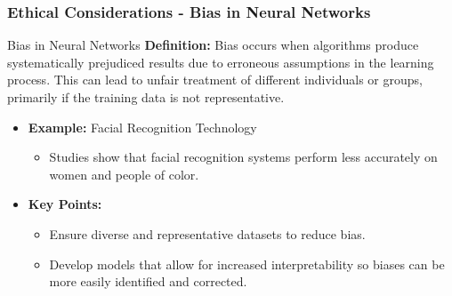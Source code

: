 \documentclass{beamer}
\begin{document}
\begin{frame}[fragile]
    \frametitle{Ethical Considerations - Bias in Neural Networks}
    \begin{block}{Bias in Neural Networks}
        \textbf{Definition:} Bias occurs when algorithms produce systematically prejudiced results due to erroneous assumptions in the learning process.
        This can lead to unfair treatment of different individuals or groups, primarily if the training data is not representative.
    \end{block}

    \begin{itemize}
        \item \textbf{Example:} Facial Recognition Technology
              \begin{itemize}
                  \item Studies show that facial recognition systems perform less accurately on women and people of color.
              \end{itemize}
        
        \item \textbf{Key Points:}
              \begin{itemize}
                  \item Ensure diverse and representative datasets to reduce bias.
                  \item Develop models that allow for increased interpretability so biases can be more easily identified and corrected.
              \end{itemize}
    \end{itemize}
\end{frame}
\end{document}
